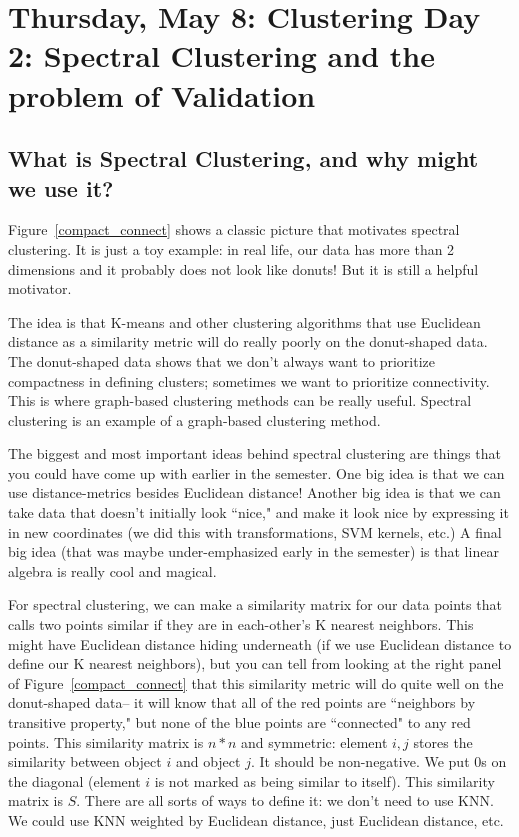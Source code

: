 \section{Thursday, May  8: Clustering Day 2: Spectral Clustering and the problem of Validation}

\subsection{What is Spectral Clustering, and why might we use it?}

Figure~\ref{compact_connect} shows a classic picture that motivates spectral clustering. It is just a toy example: in real life, our data has more than 2 dimensions and it probably does not look like donuts! But it is still a helpful motivator. 

The idea is that K-means and other clustering algorithms that use Euclidean distance as a similarity metric will do really poorly on the donut-shaped data. The donut-shaped data shows that we don't always want to prioritize compactness in defining clusters; sometimes we want to prioritize connectivity. This is where graph-based clustering methods can be really useful. Spectral clustering is an example of a graph-based clustering method. 

The biggest and most important ideas behind spectral clustering are things that you could have come up with earlier in the semester. One big idea is that we can use distance-metrics besides Euclidean distance! Another big idea is that we can take data that doesn't initially look ``nice," and make it look nice by expressing it in new coordinates (we did this with transformations, SVM kernels, etc.) A final big idea (that was maybe under-emphasized early in the semester) is that linear algebra is really cool and magical. 

For spectral clustering, we can make a similarity matrix for our data points that calls two points similar if they are in each-other's K nearest neighbors. This might have Euclidean distance hiding underneath (if we use Euclidean distance to define our K nearest neighbors), but you can tell from looking at the right panel of Figure~\ref{compact_connect} that this similarity metric will do quite well on the donut-shaped data-- it will know that all of the red points are ``neighbors by transitive property," but none of the blue points are ``connected" to any red points. This similarity matrix is $n * n$ and symmetric: element $i,j$ stores the similarity between object $i$ and object $j$. It should be non-negative. We put $0$s on the diagonal (element $i$ is not marked as being similar to itself). This similarity matrix is $S$. There are all sorts of ways to define it: we don't need to use KNN. We could use KNN weighted by Euclidean distance, just Euclidean distance, etc. 

